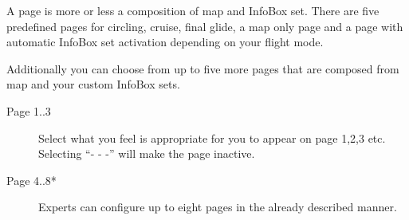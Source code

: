 A page is more or less a composition of map and InfoBox set. There are five 
predefined pages for circling, cruise, final glide, a map only page and a 
page with automatic InfoBox set activation depending on your flight mode.

Additionally you can choose from up to five more pages that are composed from map 
and your custom InfoBox sets.  

\begin{description}
\item[Page 1..3]  Select what you feel is appropriate for you to appear on page 1,2,3 etc. 
  Selecting ``- - -'' will make the page inactive.
\item[Page 4..8*]  Experts can configure up to eight pages in the already 
  described manner.
\end{description}

